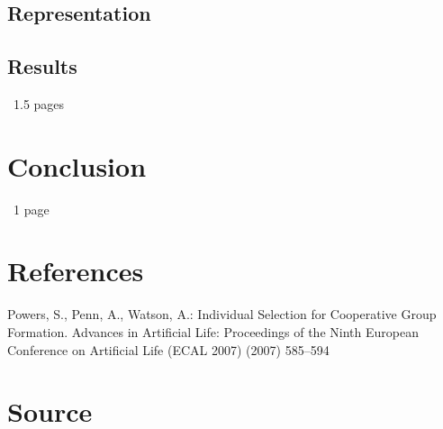 \documentclass[11pt]{article}
\begin{document}
\subsection{Representation}
\subsection{Results}
~1.5 pages

\section{Conclusion}
~1 page

\section*{References}
\begin{thebibliography}{9}

Powers, S., Penn, A., Watson, A.: Individual Selection for Cooperative Group Formation. Advances in Artificial Life: Proceedings of the Ninth European Conference on Artificial Life (ECAL 2007) (2007) 585--594

\end{thebibliography}

\appendix
\section{Source}

\end{document}
